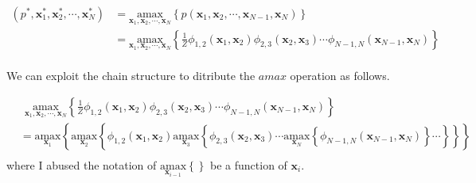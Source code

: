 \documentclass[a4]{article}
\begin{document}
\begin{equation}
\begin{aligned}
(p^*, \bm{x}^*_1, \bm{x}^*_2, \cdots, \bm{x}^*_N)
&= 
\underset{\bm{x}_1, \bm{x}_2, \cdots, \bm{x}_N}{\mathrm{amax}}\left\{
p\left(\bm{x}_1,\bm{x}_2,\cdots, \bm{x}_{N-1},\bm{x}_{N}\right)\right\}\\
&= 
\underset{\bm{x}_1, \bm{x}_2, \cdots, \bm{x}_N}{\mathrm{amax}}\left\{
\frac{1}{Z}\phi_{1,2}(\bm{x}_1,\bm{x}_2)\phi_{2,3}(\bm{x}_2,\bm{x}_3)\cdots\phi_{N-1,N}(\bm{x}_{N-1},\bm{x}_{N})
\right\}\\
\end{aligned}
\end{equation}

We can exploit the chain structure to ditribute the $amax$ operation as follows.


\begin{equation}
\begin{aligned}
&\:\:
\underset{\bm{x}_1, \bm{x}_2, \cdots, \bm{x}_N}{\mathrm{amax}}\left\{
    \frac{1}{Z}\phi_{1,2}(\bm{x}_1,\bm{x}_2)\phi_{2,3}(\bm{x}_2,\bm{x}_3)\cdots\phi_{N-1,N}(\bm{x}_{N-1},\bm{x}_{N})
\right\}\\
&=
\underset{\bm{x}_1}{\mathrm{amax}}\left\{
\underset{\bm{x}_2}{\mathrm{amax}}\left\{
\phi_{1,2}(\bm{x}_1,\bm{x}_2)
\underset{\bm{x}_3}{\mathrm{amax}}\left\{
\phi_{2,3}(\bm{x}_2,\bm{x}_3)
\cdots
\underset{\bm{x}_N}{\mathrm{amax}}\left\{
\phi_{N-1,N}(\bm{x}_{N-1},\bm{x}_{N})
\right\}\cdots
\right\}
\right\}
\right\}\\
\end{aligned}
\end{equation}
where I abused the notation of $\underset{\bm{x}_{i-1}}{\mathrm{amax}}\left\{\right\}$ be
a function of $\bm{x}_i$.
\end{document}

